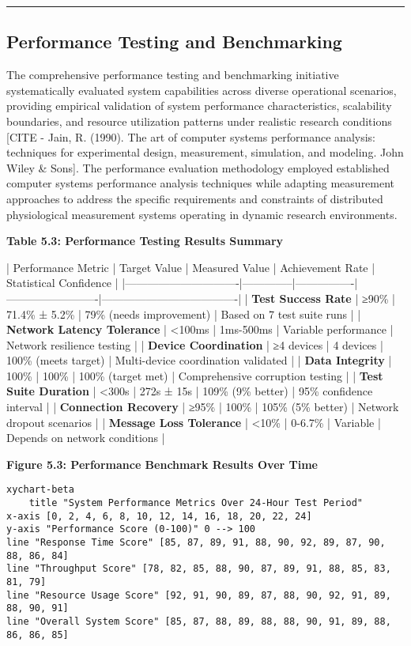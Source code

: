 \documentclass[11pt,a4paper]{report}
\begin{document}
\hrule

\subsection{Performance Testing and Benchmarking}

The comprehensive performance testing and benchmarking initiative systematically evaluated system capabilities across
diverse operational scenarios, providing empirical validation of system performance characteristics, scalability
boundaries, and resource utilization patterns under realistic research
conditions [CITE - Jain, R. (1990). The art of computer systems performance analysis: techniques for experimental design, measurement, simulation, and modeling. John Wiley \& Sons].
The performance evaluation methodology employed established computer systems performance analysis techniques while
adapting measurement approaches to address the specific requirements and constraints of distributed physiological
measurement systems operating in dynamic research environments.

\textbf{Table 5.3: Performance Testing Results Summary}

| Performance Metric            | Target Value | Measured Value | Achievement Rate        | Statistical Confidence              |
|-------------------------------|--------------|----------------|-------------------------|-------------------------------------|
| \textbf{Test Success Rate}         | ≥90\%         | 71.4\% ± 5.2\%   | 79\% (needs improvement) | Based on 7 test suite runs          |
| \textbf{Network Latency Tolerance} | <100ms       | 1ms-500ms      | Variable performance    | Network resilience testing          |
| \textbf{Device Coordination}       | ≥4 devices   | 4 devices      | 100\% (meets target)     | Multi-device coordination validated |
| \textbf{Data Integrity}            | 100\%         | 100\%           | 100\% (target met)       | Comprehensive corruption testing    |
| \textbf{Test Suite Duration}       | <300s        | 272s ± 15s     | 109\% (9\% better)        | 95\% confidence interval             |
| \textbf{Connection Recovery}       | ≥95\%         | 100\%           | 105\% (5\% better)        | Network dropout scenarios           |
| \textbf{Message Loss Tolerance}    | <10\%         | 0-6.7\%         | Variable                | Depends on network conditions       |

\textbf{Figure 5.3: Performance Benchmark Results Over Time}

\begin{verbatim}
xychart-beta
    title "System Performance Metrics Over 24-Hour Test Period"
x-axis [0, 2, 4, 6, 8, 10, 12, 14, 16, 18, 20, 22, 24]
y-axis "Performance Score (0-100)" 0 --> 100
line "Response Time Score" [85, 87, 89, 91, 88, 90, 92, 89, 87, 90, 88, 86, 84]
line "Throughput Score" [78, 82, 85, 88, 90, 87, 89, 91, 88, 85, 83, 81, 79]
line "Resource Usage Score" [92, 91, 90, 89, 87, 88, 90, 92, 91, 89, 88, 90, 91]
line "Overall System Score" [85, 87, 88, 89, 88, 88, 90, 91, 89, 88, 86, 86, 85]
\end{verbatim}
\end{document}
